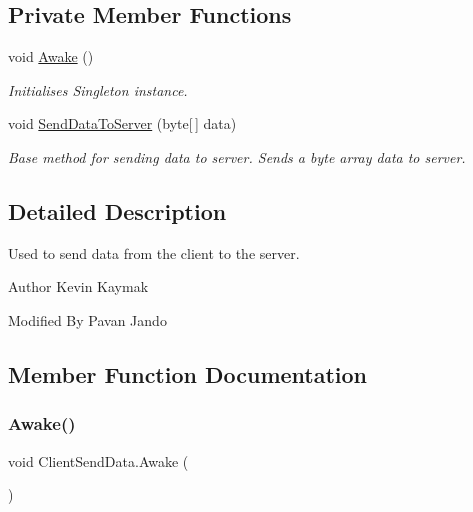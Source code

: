 \subsection*{Private Member Functions}
\begin{DoxyCompactItemize}
\item 
void \mbox{\hyperlink{class_client_send_data_a67973243537e3ae28dd54c8d27d1dba0}{Awake}} ()
\begin{DoxyCompactList}\small\item\em Initialises Singleton instance. \end{DoxyCompactList}\item 
void \mbox{\hyperlink{class_client_send_data_aad890f1086f0ac1b345b353cf1f9710e}{Send\+Data\+To\+Server}} (byte\mbox{[}$\,$\mbox{]} data)
\begin{DoxyCompactList}\small\item\em Base method for sending data to server. Sends a byte array data to server. \end{DoxyCompactList}\end{DoxyCompactItemize}


\subsection{Detailed Description}
Used to send data from the client to the server. 

\begin{DoxyAuthor}{Author}
Kevin Kaymak 

Modified By Pavan Jando
\end{DoxyAuthor}


\subsection{Member Function Documentation}
\mbox{\label{class_client_send_data_a67973243537e3ae28dd54c8d27d1dba0}} 
\subsubsection{\texorpdfstring{Awake()}{Awake()}}
{\footnotesize\ttfamily void Client\+Send\+Data.\+Awake (\begin{DoxyParamCaption}{ }\end{DoxyParamCaption})\hspace{0.3cm}{\ttfamily [private]}}



